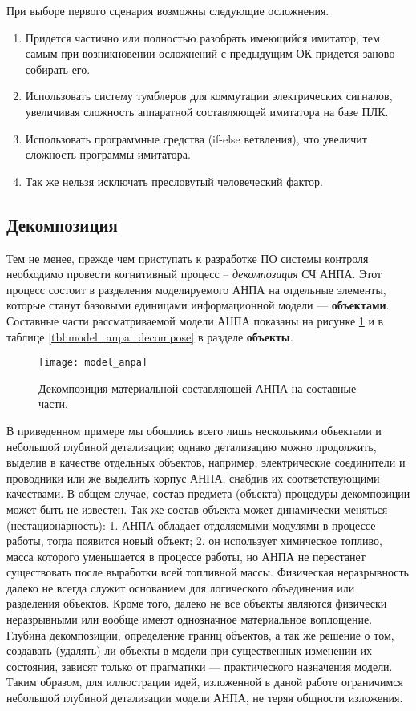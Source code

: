 При выборе первого сценария возможны следующие осложнения.
\begin{enumerate}
    \item Придется частично или полностью разобрать имеющийся имитатор, тем самым при возникновении 
        осложнений с предыдущим ОК придется заново собирать его.
    \item Использовать систему тумблеров для коммутации электрических сигналов,
        увеличивая сложность аппаратной составляющей имитатора на базе ПЛК.
    \item Использовать программные средства (if-else ветвления), что увеличит сложность программы имитатора.
    \item Так же нельзя исключать пресловутый человеческий фактор.
\end{enumerate}


\subsection{Декомпозиция}

Тем не менее, прежде чем приступать к разработке ПО системы контроля необходимо провести когнитивный процесс -- \textit{декомпозиция} СЧ АНПА.
Этот процесс состоит в разделения моделируемого АНПА на отдельные элементы, которые станут базовыми единицами информационной модели --- \textbf{объектами}.
Составные части рассматриваемой модели АНПА показаны на рисунке \ref{fig:model_anpa} и в таблице \ref{tbl:model_anpa_decompose} в разделе \textbf{объекты}.
\begin{center}
    \begin{figure}[hb!]
        \texttt{[image: model\_anpa]}
        \caption{Декомпозиция материальной составляющей АНПА на составные части.}
            \label{fig:model_anpa}
    \end{figure}
\end{center}
В приведенном примере мы обошлись всего лишь несколькими объектами и небольшой глубиной детализации;
однако детализацию можно продолжить, выделив в качестве отдельных объектов, например, электрические соединители и проводники
или же выделить корпус АНПА, снабдив их соответствующими качествами.
В общем случае, состав предмета (объекта) процедуры декомпозиции может быть не известен.
Так же состав объекта может динамически меняться (нестационарность):
1. АНПА обладает отделяемыми модулями в процессе работы, тогда появится новый объект;
2. он использует химическое топливо, масса которого уменьшается в процессе работы,
   но АНПА не перестанет существовать после выработки всей топливной массы.
Физическая неразрывность далеко не всегда служит основанием для логического объединения или разделения объектов.
Кроме того, далеко не все объекты являются физически неразрывными или вообще имеют однозначное материальное воплощение.
%
Глубина декомпозиции, определение границ объектов, а так же решение о том, создавать (удалять) ли объекты в модели
при существенных изменении их состояния, зависят только от прагматики --- практического назначения модели.
Таким образом, для иллюстрации идей, изложенной в даной работе ограничимся небольшой глубиной детализации модели АНПА,
не теряя общности изложения.

